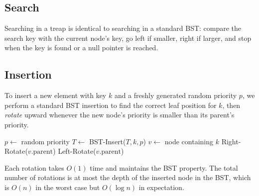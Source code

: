 \documentclass[twoside,12pt]{book}
\theoremstyle{plain}
\theoremstyle{definition}
\theoremstyle{remark}
\begin{document}
\subsection{Search}

Searching in a treap is identical to searching in a standard BST: compare the search key with the current node's key, go left if smaller, right if larger, and stop when the key is found or a null pointer is reached.

\begin{algorithm}[H]
\caption{Treap Search}
\begin{algorithmic}[1]
        \State {}
    \EndIf
        \State {}
        \State {}
    \Else
        \State {}
    \EndIf
\EndFunction
\end{algorithmic}
\end{algorithm}

\subsection{Insertion}

To insert a new element with key $k$ and a freshly generated random priority $p$, we perform a standard BST insertion to find the correct leaf position for $k$, then \emph{rotate} upward whenever the new node's priority is smaller than its parent's priority.

\begin{algorithm}[H]
\caption{Treap Insertion}
\begin{algorithmic}[1]
    \State $p \gets$ random priority
    \State $T \gets$ BST-Insert($T, k, p$)
    \State $v \gets$ node containing $k$
            \State Right-Rotate($v.\text{parent}$)
        \Else
            \State Left-Rotate($v.\text{parent}$)
        \EndIf
    \EndWhile
    \State {}
\EndFunction
\end{algorithmic}
\end{algorithm}

Each rotation takes $O(1)$ time and maintains the BST property. The total number of rotations is at most the depth of the inserted node in the BST, which is $O(n)$ in the worst case but $O(\log n)$ in expectation.
\end{document}
